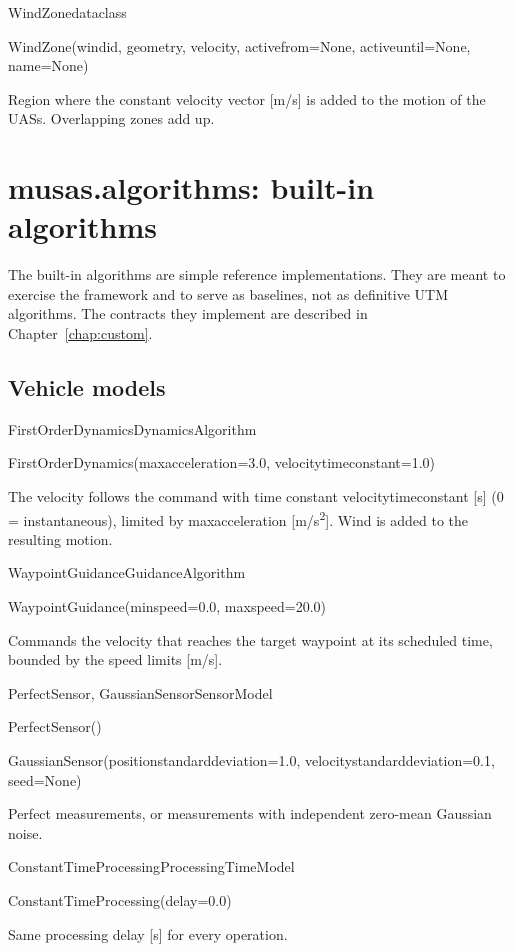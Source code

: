 \documentclass[11pt,a4paper,oneside]{report}
\newcommand{\sig}[1]{\par{\small\ttfamily\def\_{\textunderscore\allowbreak}\color{primary!85!black}#1}\par}
\newcommand{\code}[1]{\textcolor{primary!85!black}{\ttfamily\def\_{\textunderscore\allowbreak}#1}}
\newcommand{\pkg}[1]{\textcolor{accent!85!black}{\ttfamily #1}}
\begin{document}
\begin{api}{WindZone}{dataclass}
\sig{WindZone(wind\_id, geometry, velocity, active\_from=None,
active\_until=None, name=None)}
Region where the constant \code{velocity} vector [m/s] is added to the
motion of the UASs. Overlapping zones add up.
\end{api}

\section{\texorpdfstring{\pkg{musas.algorithms}}{musas.algorithms}: built-in algorithms}

The built-in algorithms are simple reference implementations. They are meant
to exercise the framework and to serve as baselines, not as definitive UTM
algorithms. The contracts they implement are described in
Chapter~\ref{chap:custom}.

\subsection{Vehicle models}

\begin{api}{FirstOrderDynamics}{DynamicsAlgorithm}
\sig{FirstOrderDynamics(max\_acceleration=3.0, velocity\_time\_constant=1.0)}
The velocity follows the command with time constant
\code{velocity\_time\_constant} [s] (0 = instantaneous), limited by
\code{max\_acceleration} [m/s\textsuperscript{2}]. Wind is added to the
resulting motion.
\end{api}

\begin{api}{WaypointGuidance}{GuidanceAlgorithm}
\sig{WaypointGuidance(min\_speed=0.0, max\_speed=20.0)}
Commands the velocity that reaches the target waypoint at its scheduled
time, bounded by the speed limits [m/s].
\end{api}

\begin{api}{PerfectSensor, GaussianSensor}{SensorModel}
\sig{PerfectSensor()}
\sig{GaussianSensor(position\_standard\_deviation=1.0,
velocity\_standard\_deviation=0.1, seed=None)}
Perfect measurements, or measurements with independent zero-mean Gaussian
noise.
\end{api}

\begin{api}{ConstantTimeProcessing}{ProcessingTimeModel}
\sig{ConstantTimeProcessing(delay=0.0)}
Same processing delay [s] for every operation.
\end{api}
\end{document}
